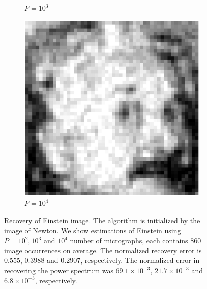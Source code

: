 \documentclass[english,11pt]{article}
\theoremstyle{plain}
\theoremstyle{definition}
\theoremstyle{remark}
\theoremstyle{plain}
\begin{document}
\begin{figure}[h!]
\begin{subfigure}[h]{0.25\textwidth}
		\caption{$P =10^3$}
	\end{subfigure}%
	\begin{subfigure}[h]{0.25\textwidth}
		\centering
		\includegraphics[scale=0.4]{Einstein_1e4}
		\caption{$P = 10^4$}
	\end{subfigure}%
	\caption{\label{fig:Einst_example} Recovery of Einstein image. The algorithm is initialized by the image of Newton. We show estimations of Einstein using $P=10^2,10^3$ and $10^4$ number of micrographs, each contains $860$ image occurrences on average. The normalized recovery error is $0.555$, $0.3988$ and $0.2907$, respectively. The normalized error in recovering the power spectrum was $69.1\times10^{-3} $, $21.7\times10^{-3} $ and $6.8\times10^{-3}$, respectively.}	
\end{figure}









\appendix
\end{document}
